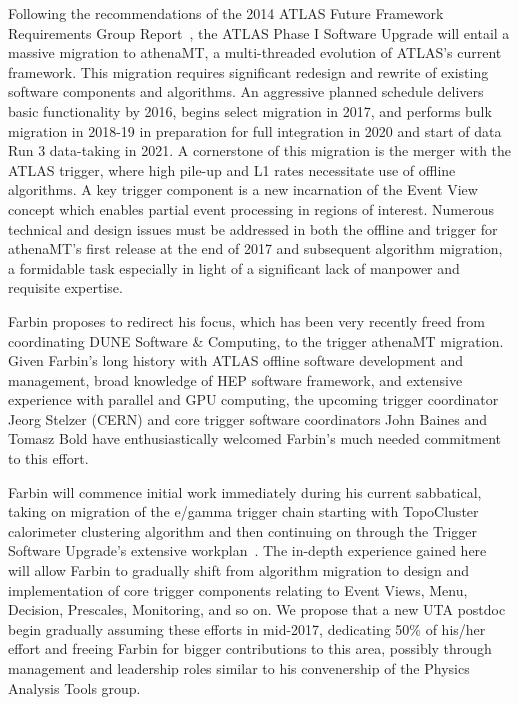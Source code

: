 
Following the recommendations of the 2014 ATLAS Future Framework
Requirements Group Report~\cite{}, the ATLAS Phase I Software Upgrade
will entail a massive migration to athenaMT, a multi-threaded
evolution of ATLAS's current framework. This migration requires
significant redesign and rewrite of existing software components and
algorithms. An aggressive planned schedule delivers basic
functionality by 2016, begins select migration in 2017, and performs
bulk migration in 2018-19 in preparation for full integration in 2020
and start of data Run 3 data-taking in 2021. A cornerstone of this
migration is the merger with the ATLAS trigger, where high pile-up and
L1 rates necessitate use of offline algorithms. A key trigger
component is a new incarnation of the Event View concept which enables
partial event processing in regions of interest. Numerous technical
and design issues must be addressed in both the offline and trigger
for athenaMT's first release at the end of 2017 and subsequent
algorithm migration, a formidable task especially in light of a
significant lack of manpower and requisite expertise.


Farbin proposes to redirect his focus, which has been very recently
freed from coordinating DUNE Software \& Computing, to the trigger
athenaMT migration. Given Farbin's long history with ATLAS offline
software development and management, broad knowledge of HEP software
framework, and extensive experience with parallel and GPU computing,
the upcoming trigger coordinator Jeorg Stelzer (CERN) and core trigger
software coordinators John Baines and Tomasz Bold have
enthusiastically welcomed Farbin's much needed commitment to this
effort. 

Farbin will commence initial work immediately during his current
sabbatical, taking on migration of the e/gamma trigger chain starting
with TopoCluster calorimeter clustering algorithm and then continuing
on through the Trigger Software Upgrade's extensive
workplan~\cite{}. The in-depth experience gained here will allow
Farbin to gradually shift from algorithm migration to design and
implementation of core trigger components relating to Event Views,
Menu, Decision, Prescales, Monitoring, and so on.  We propose that a
new UTA postdoc begin gradually assuming these efforts in mid-2017,
dedicating 50\% of his/her effort and freeing Farbin for bigger
contributions to this area, possibly through management and leadership
roles similar to his convenership of the Physics Analysis Tools group.

